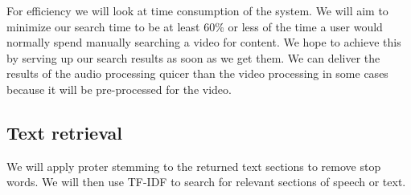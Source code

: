 \documentclass[a4paper,12pt]{article}
\begin{document}
For efficiency we will look at time consumption of the system. We will aim to minimize our search time to be at least 60\% or less of the time a user would normally spend manually searching a video for content. We hope to achieve this by serving up our search results as soon as we get them. We can deliver the results of the audio processing quicer than the video processing in some cases because it will be pre-processed for the video.

\subsection{Text retrieval}
We will apply proter stemming to the returned text sections to remove stop words. We will then use TF-IDF to search for relevant sections of speech or text.

\newpage
\theendnotes
\end{document}

